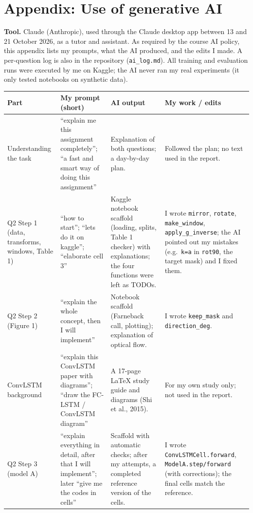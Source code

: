 \section*{Appendix: Use of generative AI}

\textbf{Tool.} Claude (Anthropic), used through the Claude desktop app between 13 and 21 October 2026, as a tutor and assistant. As required by the course AI policy, this appendix lists my prompts, what the AI produced, and the edits I made. A per-question log is also in the repository (\texttt{ai\_log.md}). All training and evaluation runs were executed by me on Kaggle; the AI never ran my real experiments (it only tested notebooks on synthetic data).

\small
\begin{longtable}{@{}p{2.5cm}p{4.3cm}p{5.0cm}p{4.0cm}@{}}
\toprule
\textbf{Part} & \textbf{My prompt (short)} & \textbf{AI output} & \textbf{My work / edits}\\
\midrule\endhead
Understanding the task & ``explain me this assignment completely''; ``a fast and smart way of doing this assignment'' & Explanation of both questions; a day-by-day plan. & Followed the plan; no text used in the report. \\
Q2 Step 1 (data, transforms, windows, Table 1) & ``how to start''; ``lets do it on kaggle''; ``elaborate cell 3'' & Kaggle notebook scaffold (loading, splits, Table 1 checker) with explanations; the four functions were left as TODOs. & I wrote \texttt{mirror}, \texttt{rotate}, \texttt{make\_window}, \texttt{apply\_g\_inverse}; the AI pointed out my mistakes (e.g.\ \texttt{k=a} in \texttt{rot90}, the target mask) and I fixed them. \\
Q2 Step 2 (Figure 1) & ``explain the whole concept, then I will implement'' & Notebook scaffold (Farneback call, plotting); explanation of optical flow. & I wrote \texttt{keep\_mask} and \texttt{direction\_deg}. \\
ConvLSTM background & ``explain this ConvLSTM paper with diagrams''; ``draw the FC-LSTM / ConvLSTM diagram'' & A 17-page LaTeX study guide and diagrams (Shi et al., 2015). & For my own study only; not used in the report. \\
Q2 Step 3 (model A) & ``explain everything in detail, after that I will implement''; later ``give me the codes in cells'' & Scaffold with automatic checks; after my attempts, a completed reference version of the cells. & I wrote \texttt{ConvLSTMCell.forward}, \texttt{ModelA.step/forward} (with corrections); the final cells match the reference. \\

\end{longtable}
